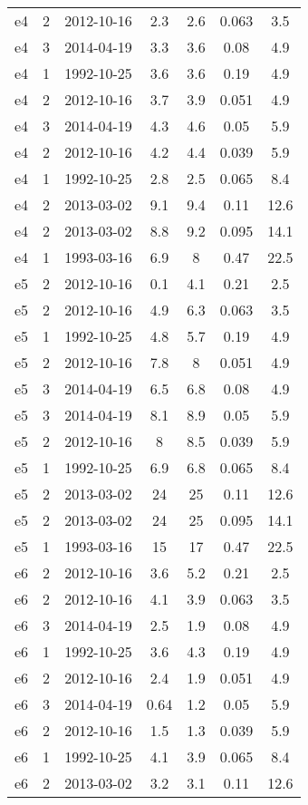 \begin{longtable}[htp]
\begin{longtable}{ccccccc}
e4 & 2 & 2012-10-16 & 2.3 & 2.6 & 0.063 & 3.5 \\
e4 & 3 & 2014-04-19 & 3.3 & 3.6 & 0.08 & 4.9 \\
e4 & 1 & 1992-10-25 & 3.6 & 3.6 & 0.19 & 4.9 \\
e4 & 2 & 2012-10-16 & 3.7 & 3.9 & 0.051 & 4.9 \\
e4 & 3 & 2014-04-19 & 4.3 & 4.6 & 0.05 & 5.9 \\
e4 & 2 & 2012-10-16 & 4.2 & 4.4 & 0.039 & 5.9 \\
e4 & 1 & 1992-10-25 & 2.8 & 2.5 & 0.065 & 8.4 \\
e4 & 2 & 2013-03-02 & 9.1 & 9.4 & 0.11 & 12.6 \\
e4 & 2 & 2013-03-02 & 8.8 & 9.2 & 0.095 & 14.1 \\
e4 & 1 & 1993-03-16 & 6.9 & 8 & 0.47 & 22.5 \\
e5 & 2 & 2012-10-16 & 0.1 & 4.1 & 0.21 & 2.5 \\
e5 & 2 & 2012-10-16 & 4.9 & 6.3 & 0.063 & 3.5 \\
e5 & 1 & 1992-10-25 & 4.8 & 5.7 & 0.19 & 4.9 \\
e5 & 2 & 2012-10-16 & 7.8 & 8 & 0.051 & 4.9 \\
e5 & 3 & 2014-04-19 & 6.5 & 6.8 & 0.08 & 4.9 \\
e5 & 3 & 2014-04-19 & 8.1 & 8.9 & 0.05 & 5.9 \\
e5 & 2 & 2012-10-16 & 8 & 8.5 & 0.039 & 5.9 \\
e5 & 1 & 1992-10-25 & 6.9 & 6.8 & 0.065 & 8.4 \\
e5 & 2 & 2013-03-02 & 24 & 25 & 0.11 & 12.6 \\
e5 & 2 & 2013-03-02 & 24 & 25 & 0.095 & 14.1 \\
e5 & 1 & 1993-03-16 & 15 & 17 & 0.47 & 22.5 \\
e6 & 2 & 2012-10-16 & 3.6 & 5.2 & 0.21 & 2.5 \\
e6 & 2 & 2012-10-16 & 4.1 & 3.9 & 0.063 & 3.5 \\
e6 & 3 & 2014-04-19 & 2.5 & 1.9 & 0.08 & 4.9 \\
e6 & 1 & 1992-10-25 & 3.6 & 4.3 & 0.19 & 4.9 \\
e6 & 2 & 2012-10-16 & 2.4 & 1.9 & 0.051 & 4.9 \\
e6 & 3 & 2014-04-19 & 0.64 & 1.2 & 0.05 & 5.9 \\
e6 & 2 & 2012-10-16 & 1.5 & 1.3 & 0.039 & 5.9 \\
e6 & 1 & 1992-10-25 & 4.1 & 3.9 & 0.065 & 8.4 \\
e6 & 2 & 2013-03-02 & 3.2 & 3.1 & 0.11 & 12.6 \\

\end{longtable}
\end{longtable}
